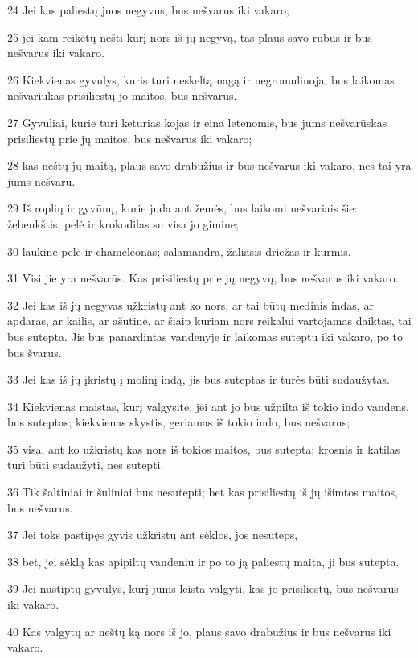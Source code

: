 \par 24 Jei kas paliestų juos negyvus, bus nešvarus iki vakaro; 
\par 25 jei kam reikėtų nešti kurį nors iš jų negyvą, tas plaus savo rūbus ir bus nešvarus iki vakaro. 
\par 26 Kiekvienas gyvulys, kuris turi neskeltą nagą ir negromuliuoja, bus laikomas nešvariu­kas prisiliestų jo maitos, bus nešvarus. 
\par 27 Gyvuliai, kurie turi keturias kojas ir eina letenomis, bus jums nešvarūs­kas prisiliestų prie jų maitos, bus nešvarus iki vakaro; 
\par 28 kas neštų jų maitą, plaus savo drabužius ir bus nešvarus iki vakaro, nes tai yra jums nešvaru. 
\par 29 Iš roplių ir gyvūnų, kurie juda ant žemės, bus laikomi nešvariais šie: žebenkštis, pelė ir krokodilas su visa jo gimine; 
\par 30 laukinė pelė ir chameleonas; salamandra, žaliasis driežas ir kurmis. 
\par 31 Visi jie yra nešvarūs. Kas prisiliestų prie jų negyvų, bus nešvarus iki vakaro. 
\par 32 Jei kas iš jų negyvas užkristų ant ko nors, ar tai būtų medinis indas, ar apdaras, ar kailis, ar ašutinė, ar šiaip kuriam nors reikalui vartojamas daiktas, tai bus sutepta. Jis bus panardintas vandenyje ir laikomas suteptu iki vakaro, po to bus švarus. 
\par 33 Jei kas iš jų įkristų į molinį indą, jis bus suteptas ir turės būti sudaužytas. 
\par 34 Kiekvienas maistas, kurį valgysite, jei ant jo bus užpilta iš tokio indo vandens, bus suteptas; kiekvienas skystis, geriamas iš tokio indo, bus nešvarus; 
\par 35 visa, ant ko užkristų kas nors iš tokios maitos, bus sutepta; krosnis ir katilas turi būti sudaužyti, nes sutepti. 
\par 36 Tik šaltiniai ir šuliniai bus nesutepti; bet kas prisiliestų iš jų išimtos maitos, bus nešvarus. 
\par 37 Jei toks pastipęs gyvis užkristų ant sėklos, jos nesuteps, 
\par 38 bet, jei sėklą kas apipiltų vandeniu ir po to ją paliestų maita, ji bus sutepta. 
\par 39 Jei nustiptų gyvulys, kurį jums leista valgyti, kas jo prisiliestų, bus nešvarus iki vakaro. 
\par 40 Kas valgytų ar neštų ką nors iš jo, plaus savo drabužius ir bus nešvarus iki vakaro. 
